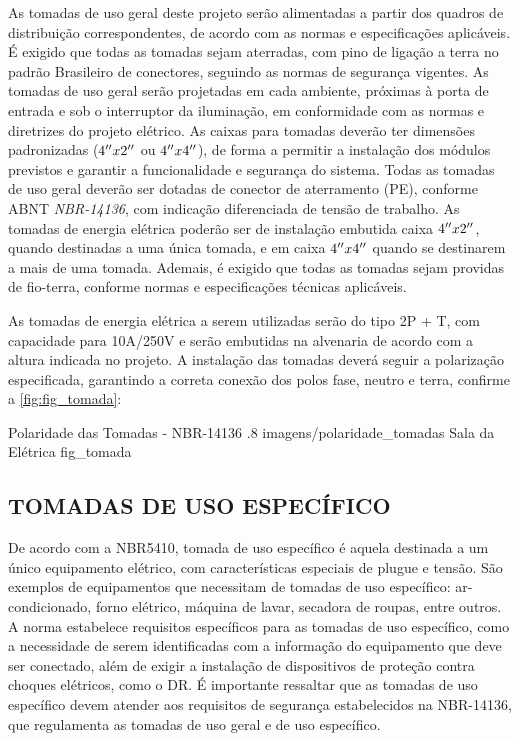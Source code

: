 As tomadas de uso geral deste projeto serão alimentadas a partir dos quadros de distribuição correspondentes, de acordo com as normas e especificações aplicáveis. É exigido que todas as tomadas sejam aterradas, com pino de ligação a terra no padrão Brasileiro de conectores, seguindo as normas de segurança vigentes. As tomadas de uso geral serão projetadas em cada ambiente, próximas à porta de entrada e sob o interruptor da iluminação, em conformidade com as normas e diretrizes do projeto elétrico. As caixas para tomadas deverão ter dimensões padronizadas ($4 {}^{\prime\prime} x 2 {}^{\prime\prime}$ ou $4 {}^{\prime\prime} x 4 {}^{\prime\prime}$), de forma a permitir a instalação dos módulos previstos e garantir a funcionalidade e segurança do sistema. Todas as tomadas de uso geral deverão ser dotadas de conector de aterramento (PE), conforme ABNT \textit{NBR-14136}, com indicação diferenciada de tensão de trabalho. As tomadas de energia elétrica poderão ser de instalação embutida caixa $4 {}^{\prime\prime} x 2 {}^{\prime\prime}$, quando destinadas a uma única tomada, e em caixa $4 {}^{\prime\prime} x4 {}^{\prime\prime}$ quando se destinarem a mais de uma tomada. Ademais, é exigido que todas as tomadas sejam providas de fio-terra, conforme normas e especificações técnicas aplicáveis.

As tomadas de energia elétrica a serem utilizadas serão do tipo 2P + T, com capacidade para 10A/250V e serão embutidas na alvenaria de acordo com a altura indicada no projeto. A instalação das tomadas deverá seguir a polarização especificada, garantindo a correta conexão dos polos fase, neutro e terra, confirme a \autoref{fig:fig_tomada}:

\figura
{Polaridade das Tomadas - NBR-14136} %
{.8} %
{imagens/polaridade_tomadas} %
{Sala da Elétrica} %
{fig_tomada} %
{}
{}

\subsection{TOMADAS DE USO ESPECÍFICO}
De acordo com a NBR5410, tomada de uso específico é aquela destinada a um único equipamento elétrico, com características especiais de plugue e tensão. São exemplos de equipamentos que necessitam de tomadas de uso específico: ar-condicionado, forno elétrico, máquina de lavar, secadora de roupas, entre outros. A norma estabelece requisitos específicos para as tomadas de uso específico, como a necessidade de serem identificadas com a informação do equipamento que deve ser conectado, além de exigir a instalação de dispositivos de proteção contra choques elétricos, como o DR. É importante ressaltar que as tomadas de uso específico devem atender aos requisitos de segurança estabelecidos na NBR-14136, que regulamenta as tomadas de uso geral e de uso específico.

